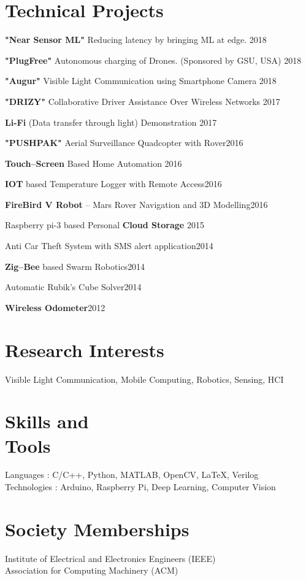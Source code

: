\section{Technical Projects}
\begin{innerlist}
    \item \textbf{"Near Sensor ML"} Reducing latency by bringing ML at edge. \hfill {2018}
    \item \textbf{"PlugFree"} Autonomous charging of Drones. (Sponsored by GSU, USA) \hfill {2018}
    \item \textbf{"Augur"} Visible Light Communication using Smartphone Camera \hfill {2018}
    \item \textbf{"DRIZY"} Collaborative Driver Assistance Over Wireless Networks \hfill {2017}
    \item \textbf{Li-Fi} (Data transfer through light) Demonstration \hfill {2017}
    \item \textbf{"PUSHPAK"} Aerial Surveillance Quadcopter with Rover\hfill {2016}
    \item \textbf{Touch--Screen} Based Home Automation \hfill {2016}
    \item \textbf{IOT} based Temperature Logger with Remote Access\hfill {2016}
    \item \textbf{FireBird V Robot} -- Mars Rover Navigation and 3D Modelling\hfill {2016}
    \item Raspberry pi-3 based Personal \textbf{Cloud Storage} \hfill {2015}
    \item Anti Car Theft System with SMS alert application\hfill {2014}
    \item \textbf{Zig--Bee} based Swarm Robotics\hfill {2014}
    \item Automatic Rubik’s Cube Solver\hfill {2014}
    \item \textbf{Wireless Odometer}\hfill {2012}
\end{innerlist}

\section{Research Interests}
Visible Light Communication, Mobile Computing, Robotics, Sensing, HCI

\section{Skills and \\Tools}
Languages : C/C++, Python, MATLAB, OpenCV, \LaTeX, Verilog\\
Technologies : Arduino, Raspberry Pi, Deep Learning, Computer Vision

\section{Society Memberships}
Institute of Electrical and Electronics Engineers (IEEE)\\
Association for Computing Machinery (ACM)



